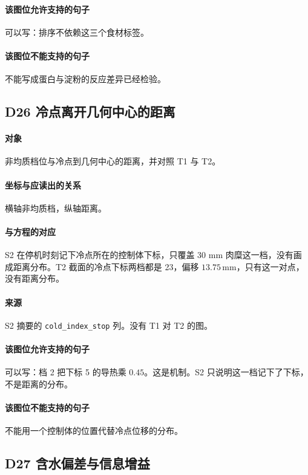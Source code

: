 \paragraph{该图位允许支持的句子}
可以写：排序不依赖这三个食材标签。

\paragraph{该图位不能支持的句子}
不能写成蛋白与淀粉的反应差异已经检验。

\subsection{D26 冷点离开几何中心的距离}
\paragraph{对象}
非均质档位与冷点到几何中心的距离，并对照 T1 与 T2。

\paragraph{坐标与应读出的关系}
横轴非均质档，纵轴距离。

\paragraph{与方程的对应}
S2 在停机时刻记下冷点所在的控制体下标，只覆盖 30 mm 肉糜这一档，没有画成距离分布。T2 截面的冷点下标两档都是 23，偏移 \(13.75\,\mathrm{mm}\)，只有这一对点，没有距离分布。

\paragraph{来源}
S2 摘要的 \texttt{cold\_index\_stop} 列。没有 T1 对 T2 的图。

\paragraph{该图位允许支持的句子}
可以写：档 2 把下标 5 的导热乘 $0.45$。这是机制。S2 只说明这一档记下了下标，不是距离的分布。

\paragraph{该图位不能支持的句子}
不能用一个控制体的位置代替冷点位移的分布。

\subsection{D27 含水偏差与信息增益}
